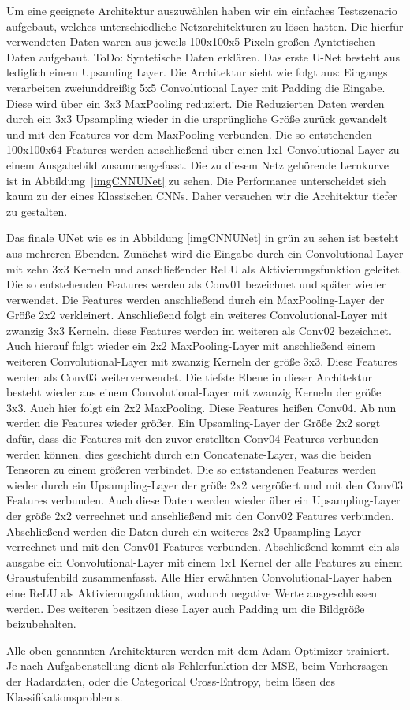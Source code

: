 Um eine geeignete Architektur auszuwählen haben wir ein einfaches Testszenario aufgebaut, welches unterschiedliche Netzarchitekturen zu lösen hatten. Die hierfür verwendeten Daten waren aus jeweils 100x100x5 Pixeln großen Ayntetischen Daten aufgebaut.
ToDo: Syntetische Daten erklären.
Das erste U-Net besteht aus lediglich einem Upsamling Layer. Die Architektur sieht wie folgt aus:
Eingangs verarbeiten zweiunddreißig 5x5 Convolutional Layer mit Padding die Eingabe. Diese wird über ein 3x3 MaxPooling reduziert. Die Reduzierten Daten werden durch ein 3x3 Upsampling wieder in die ursprüngliche Größe zurück gewandelt und mit den Features vor dem MaxPooling verbunden. Die so entstehenden 100x100x64 Features werden anschließend über einen 1x1 Convolutional Layer zu einem Ausgabebild zusammengefasst.
Die zu diesem Netz gehörende Lernkurve ist in Abbildung~\ref{imgCNNUNet} zu sehen. Die Performance unterscheidet sich kaum zu der eines Klassischen CNNs. Daher versuchen wir die Architektur tiefer zu gestalten.

Das finale UNet wie es in Abbildung \ref{imgCNNUNet} in grün zu sehen ist besteht aus mehreren Ebenden.
Zunächst wird die Eingabe durch ein Convolutional-Layer mit zehn 3x3 Kerneln und anschließender ReLU als Aktivierungsfunktion geleitet. Die so entstehenden Features werden als Conv01 bezeichnet und später wieder verwendet.
Die Features werden anschließend durch ein MaxPooling-Layer der Größe 2x2 verkleinert. Anschließend folgt ein weiteres Convolutional-Layer mit zwanzig 3x3 Kerneln. diese Features werden im weiteren als Conv02 bezeichnet.
Auch hierauf folgt wieder ein 2x2 MaxPooling-Layer mit anschließend einem weiteren Convolutional-Layer mit zwanzig Kerneln der größe 3x3. Diese Features werden als Conv03 weiterverwendet.
Die tiefste Ebene in dieser Architektur besteht wieder aus einem Convolutional-Layer mit zwanzig Kerneln der größe 3x3. Auch hier folgt ein 2x2 MaxPooling. Diese Features heißen Conv04.
Ab nun werden die Features wieder größer. Ein Upsamling-Layer der Größe 2x2 sorgt dafür, dass die Features mit den zuvor erstellten Conv04 Features verbunden werden können. dies geschieht durch ein Concatenate-Layer, was die beiden Tensoren zu einem größeren verbindet. Die so entstandenen Features werden wieder durch ein Upsampling-Layer der größe 2x2 vergrößert und mit den Conv03 Features verbunden. Auch diese Daten werden wieder über ein Upsampling-Layer der größe 2x2 verrechnet und anschließend mit den Conv02 Features verbunden. Abschließend werden die Daten durch ein weiteres 2x2 Upsampling-Layer verrechnet und mit den Conv01 Features verbunden. Abschließend kommt ein als ausgabe ein Convolutional-Layer mit einem 1x1 Kernel der alle Features zu einem Graustufenbild zusammenfasst.
Alle Hier erwähnten Convolutional-Layer haben eine ReLU als Aktivierungsfunktion, wodurch negative Werte ausgeschlossen werden. Des weiteren besitzen diese Layer auch Padding um die Bildgröße beizubehalten.

Alle oben genannten Architekturen werden mit dem Adam-Optimizer trainiert. Je nach Aufgabenstellung dient als Fehlerfunktion der MSE, beim Vorhersagen der Radardaten, oder die Categorical Cross-Entropy, beim lösen des Klassifikationsproblems.
